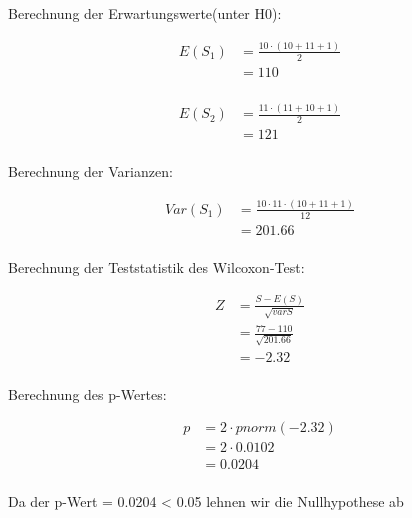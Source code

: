 \documentclass[a4paper,12pt]{article}
\begin{document}
Berechnung der Erwartungswerte(unter H0):

\begin{align*}
E(S_1)
&= \frac{10\cdot(10+11+1)}{2} \\
&=  110\\
\end{align*}

\begin{align*}
E(S_2)
&= \frac{11\cdot(11+10+1)}{2} \\
&=  121\\
\end{align*}

Berechnung der Varianzen:

\begin{align*}
Var(S_1)
&= \frac{10\cdot 11 \cdot (10+11+1)}{12} \\
&=  201.66 \\
\end{align*}


Berechnung der Teststatistik des Wilcoxon-Test:

\begin{align*}
Z
&= \frac{S-E(S)}{\sqrt{varS}} \\
&= \frac{77-110}{\sqrt{201.66}}  \\
&=  -2.32 \\
\end{align*}

Berechnung des p-Wertes:

\begin{align*}
p
&= 2 \cdot pnorm(-2.32) \\
&= 2 \cdot 0.0102  \\
&= 0.0204 \\
\end{align*}

Da der p-Wert = 0.0204 < 0.05 lehnen wir die Nullhypothese ab

	
	
\end{document}
